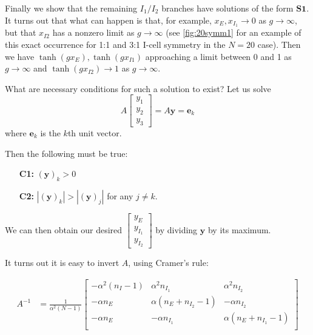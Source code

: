 \documentclass[11pt,reqno]{amsart}
\begin{document}
Finally we show that the remaining $I_1/I_2$ branches have solutions of the form $\textbf{S1}$.
It turns out that what can happen is that, for example, $x_{E}, x_{I_1} \rightarrow 0$ as $g \rightarrow \infty$, but that $x_{I2}$ has a nonzero limit as $g \rightarrow \infty$ (see \cref{fig:20symm1} for an example of this exact occurrence for 1:1 and 3:1 I-cell symmetry in the $N=20$ case). Then we have $\tanh(g x_E), \tanh(g x_{I1})$ approaching a limit between 0 and 1 as $g \rightarrow \infty$ and $\tanh(g x_{I2}) \rightarrow 1$ as $g \rightarrow \infty$.

What are necessary conditions for such a solution to exist? Let us solve
\[ A \begin{bmatrix} y_1\\y_2\\y_3\end{bmatrix} = A \textbf{y} = \textbf{e}_k 
\]
where $\textbf{e}_k$ is the $k$th unit vector.

Then the following must be true:
\begin{enumerate}
    \item[\textbf{C1:}] $(\textbf{y})_k > 0$
    \item[\textbf{C2:}] $|(\textbf{y})_k| > |(\textbf{y})_j|$ for any $j\not=k$. 
\end{enumerate}
We can then obtain our desired $\begin{bmatrix} y_E\\y_{I_1}\\y_{I_2}\end{bmatrix} $ by dividing $\textbf{y}$ by its maximum.



It turns out it is easy to invert $A$, using Cramer's rule:

\begin{align*}
   A^{-1} & = \frac{1}{\alpha^2 (N-1)}\begin{bmatrix}
    -\alpha^2 (n_I-1) & \alpha^2 n_{I_1} & \alpha^2 n_{I_2}\\
    -\alpha n_E & \alpha (n_E + n_{I_2}-1) & -\alpha n_{I_2}\\
    -\alpha n_E & -\alpha n_{I_1} & \alpha (n_E + n_{I_1}-1)\\
    \end{bmatrix}
\end{align*}
\end{document}
